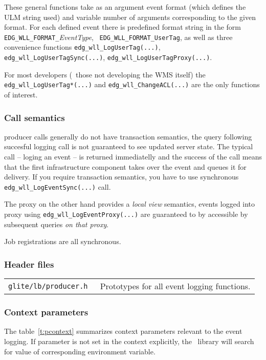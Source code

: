 These general functions take as an argument event format (which
defines the ULM string used) and variable number of arguments corresponding
to the given format. For each defined event there is predefined format
string in the form \verb'EDG_WLL_FORMAT_'\textit{EventType}, \eg\
\verb'EDG_WLL_FORMAT_UserTag', as well as three convenience functions
\verb'edg_wll_LogUserTag(...)', \verb'edg_wll_LogUserTagSync(...)',
\verb'edg_wll_LogUserTagProxy(...)'.

For most developers (\ie\ those not developing the WMS itself) the
\verb'edg_wll_LogUserTag*(...)' and \verb'edg_wll_ChangeACL(...)' are
the only functions of interest.

\subsubsection{Call semantics}
\LB producer calls generally do not have transaction semantics, the
query following succesful logging call is not guaranteed to see
updated \LB server state. The typical call -- loging an event -- is
returned immediatelly and the success of the call means that the first
\LB infrastructure component takes over the event and queues it for
delivery. If you require transaction semantics, you have to use
synchronous \verb'edg_wll_LogEventSync(...)' call.

The \LB proxy on the other hand provides a \emph{local view}
semantics, events logged into proxy using
\verb'edg_wll_LogEventProxy(...)' are guaranteed to by accessible by
subsequent queries \emph{on that proxy}.

Job registrations are all synchronous.

\subsubsection{Header files}

\begin{table}[h]
\begin{tabularx}{\textwidth}{>{\tt}lX}
glite/lb/producer.h & Prototypes for all event logging functions. \\
\end{tabularx}
\end{table}

\subsubsection{Context parameters}
The table~\ref{t:pcontext} summarizes context parameters relevant to the
event logging. If  parameter is not set in the context explicitly, the
\LB\ library will search for value of corresponding environment
variable.

